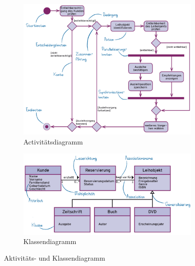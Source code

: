 \documentclass[a4paper]{article}
\begin{document}
			\begin{figure}[!htb]
				\centering
				\begin{subfigure}{.45\textwidth}
					\centering
					\includegraphics[width=\textwidth]{img/re/03/activity_dia.png}
					\caption{Activitätsdiagramm}
					\label{fig:re_activity_dia}
				\end{subfigure}
				\begin{subfigure}{.45\textwidth}
					\centering
					\includegraphics[width=\textwidth]{img/re/03/class_dia.png}
					\caption{Klassendiagramm}
					\label{fig:re_class_dia}
				\end{subfigure}
				\caption{Aktivitäts- und Klassendiagramm}
				\label{fig:re_activity_class_dia}
			\end{figure}
		
\end{document}
